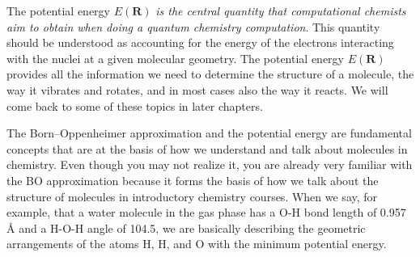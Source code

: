 \documentclass[../Main/chem371-notes.tex]{subfiles}
\begin{document}
The  potential energy $E(\mathbf{R})$ \emph{is the central quantity that computational chemists aim to obtain when doing a quantum chemistry computation}.
This quantity should be understood as accounting for the energy of the electrons interacting with the nuclei at a given molecular geometry.
The potential energy $E(\mathbf{R})$ provides all the information we need to determine the structure of a molecule, the way it vibrates and rotates, and in most cases also the way it reacts.
We will come back to some of these topics in later chapters.

The Born--Oppenheimer approximation and the potential energy are fundamental concepts that are at the basis of how we understand and talk about molecules in chemistry.
Even though you may not realize it, you are already very familiar with the BO approximation because it forms the basis of how we talk about the structure of molecules in introductory chemistry courses.
When we say, for example, that a water molecule in the gas phase has a O-H bond length of  0.957 \AA{} and a H-O-H angle of 104.5\textdegree, we are basically describing the geometric arrangements of the atoms H, H, and O with the minimum potential energy.


\end{document}
